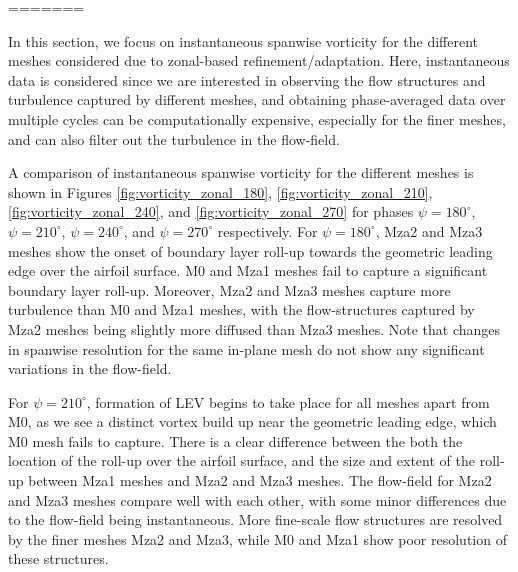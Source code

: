 =======



In this section, we focus on instantaneous spanwise vorticity for the different meshes considered due to zonal-based refinement/adaptation. Here, instantaneous data is considered since we are interested in observing the flow structures and turbulence captured by different meshes, and obtaining phase-averaged data over multiple cycles can be computationally expensive, especially for the finer meshes, and can also filter out the turbulence in the flow-field.

A comparison of instantaneous spanwise vorticity for the different meshes is shown in Figures \ref{fig:vorticity_zonal_180}, \ref{fig:vorticity_zonal_210}, \ref{fig:vorticity_zonal_240}, and \ref{fig:vorticity_zonal_270} for phases $\psi=180^\circ$, $\psi=210^\circ$, $\psi=240^\circ$, and $\psi=270^\circ$ respectively. For $\psi=180^\circ$, Mza2 and Mza3 meshes show the onset of boundary layer roll-up towards the geometric leading edge over the airfoil surface. M0 and Mza1 meshes fail to capture a significant boundary layer roll-up. Moreover, Mza2 and Mza3 meshes capture more turbulence than M0 and Mza1 meshes, with the flow-structures captured by Mza2 meshes being slightly more diffused than Mza3 meshes. Note that changes in spanwise resolution for the same in-plane mesh do not show any significant variations in the flow-field.

For $\psi=210^\circ$, formation of LEV begins to take place for all meshes apart from M0, as we see a distinct vortex build up near the geometric leading edge, which M0 mesh fails to capture. There is a clear difference between the both the location of the roll-up over the airfoil surface, and the size and extent of the roll-up between Mza1 meshes and Mza2 and Mza3 meshes. The flow-field for Mza2 and Mza3 meshes compare well with each other, with some minor differences due to the flow-field being instantaneous. More fine-scale flow structures are resolved by the finer meshes Mza2 and Mza3, while M0 and Mza1 show poor resolution of these structures.





